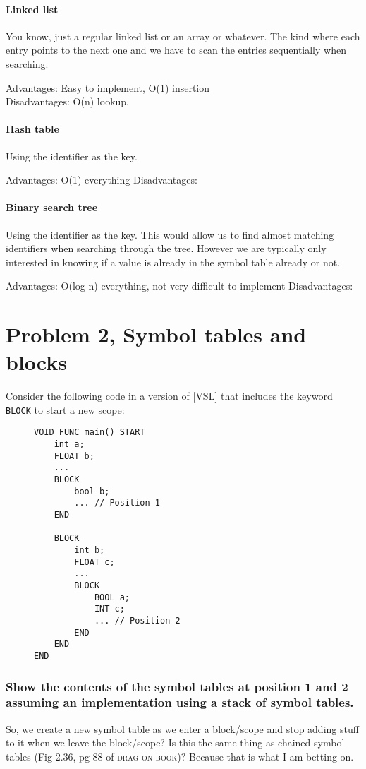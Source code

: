 \paragraph{Linked list}
You know, just a regular linked list or an array or whatever.
The kind where each entry points to the next one and we have to scan the entries sequentially when searching.

Advantages: Easy to implement, O(1) insertion\\
Disadvantages: O(n) lookup, 


\paragraph{Hash table}
Using the identifier as the key.

Advantages: O(1) everything
Disadvantages: 

\paragraph{Binary search tree}
Using the identifier as the key.
This would allow us to find almost matching identifiers when searching through the tree.
However we are typically only interested in knowing if a value is already in the symbol table already or not.

Advantages: O(log n) everything, not very difficult to implement
Disadvantages: 

\newpage
\setcounter{subsubsection}{0}
\section{Problem 2, Symbol tables and blocks}
Consider the following code in a version of [VSL] that includes the keyword \texttt{BLOCK} to start a new scope:
\begin{figure}[H]
\begin{verbatim}
VOID FUNC main() START
    int a;
    FLOAT b;
    ...
    BLOCK
        bool b;
        ... // Position 1
    END

    BLOCK
        int b;
        FLOAT c;
        ...
        BLOCK
            BOOL a;
            INT c;
            ... // Position 2
        END
    END
END
\end{verbatim}
\end{figure}

\subsubsection{Show the contents of the symbol tables at position 1 and 2 assuming an implementation using a stack of symbol tables.}
So, we create a new symbol table as we enter a block/scope and stop adding stuff to it when we leave the block/scope?
Is this the same thing as chained symbol tables (Fig 2.36, pg 88 of \textsc{drag on book})?
Because that is what I am betting on.

